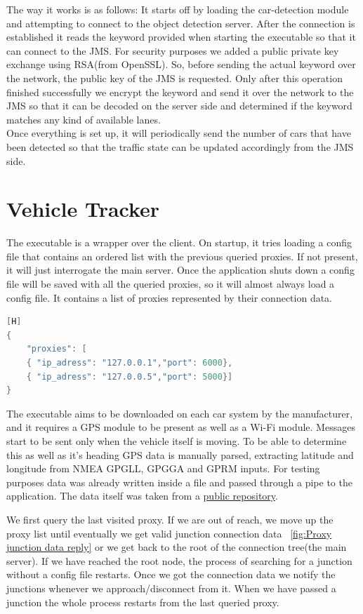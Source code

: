 \documentclass[17pt]{report}
\begin{document}
\indent
The way it works is as follows: It starts off by loading the car-detection module and attempting to 
connect to the object detection server. After the connection is 
established it reads the keyword provided when starting the executable 
so that it can connect to the JMS. For security purposes we added a 
public private key exchange using RSA(from OpenSSL). So, before sending 
the actual keyword over the network, the public key of the JMS is 
requested. Only after this operation finished successfully we encrypt 
the keyword and send it over the network to the JMS so that it can be 
decoded on the server side and determined if the keyword matches any 
kind of available lanes.\\
\indent
Once everything is set up, it will periodically
send the number of cars that have been detected so that the traffic state
can be updated accordingly from the JMS side.

\pagebreak
\section{Vehicle Tracker}
\indent \indent
The executable is a wrapper over the client. On startup, it tries loading a
config file that contains an ordered list with the previous queried proxies.
If not present, it will just interrogate the main server. Once the application
shuts down a config file will be saved with all the queried proxies, so it will
almost always load a config file. It contains a list of proxies represented by
their connection data.

\begin{lstlisting}[language = C++][H]
{
    "proxies": [
    { "ip_adress": "127.0.0.1","port": 6000},
    { "ip_adress": "127.0.0.5","port": 5000}]
}
\end{lstlisting}

The executable aims to be downloaded on each car system by the manufacturer,
and it requires a GPS module to be present as well as a Wi-Fi module. Messages
start to be sent only when the vehicle itself is moving. To be able to
determine this as well as it's heading GPS data is manually parsed, extracting
latitude and longitude from NMEA GPGLL, GPGGA and GPRM inputs. For testing
purposes data was already written inside a file and passed through a pipe to the
application. The data itself was taken from a \href{https://github.com/ChrisvdHoorn/NMEA_message_GPS_data}{public repository}.

\indent \indent
We first query the last visited proxy. If we are out of reach, we move up the proxy list
until eventually we get valid junction connection data ~\ref{fig:Proxy junction data reply} or we get back to
the root of the connection tree(the main server). If we have reached the root node, 
the process of searching for a junction without a config file restarts. Once we got the 
connection data we notify the junctions whenever we approach/disconnect from it. When we 
have passed a junction the whole process restarts from the last queried proxy.
\end{document}
